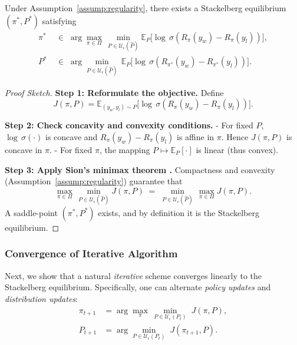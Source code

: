 \begin{theorem}[Existence]
\label{thm:existence_se}
Under Assumption~\ref{assump:regularity}, there exists a Stackelberg equilibrium \((\pi^*,P^*)\) satisfying
\[
\begin{aligned}
\pi^*
&\;\in\; 
\arg\max_{\pi \in \Pi}\,
\min_{P \in \mathcal{U}_\epsilon(\hat{P})} 
\mathbb{E}_P\bigl[\log\,\sigma(R_\pi(y_w)-R_\pi(y_l))\bigr],
\\[3pt]
P^*
&\;\in\; 
\arg\min_{P \in \mathcal{U}_\epsilon(\hat{P})}\,
\mathbb{E}_P\bigl[\log\,\sigma(R_{\pi^*}(y_w)-R_{\pi^*}(y_l))\bigr].
\end{aligned}
\]
\end{theorem}

\begin{proof}[Proof Sketch]
\textbf{Step 1: Reformulate the objective.}  
Define 
\[
J(\pi,P)=\mathbb{E}_{(y_w,y_l)\sim P}\bigl[\log\,\sigma(R_\pi(y_w)-R_\pi(y_l))\bigr].
\]
  
\textbf{Step 2: Check concavity and convexity conditions.}  
- For fixed \(P\), \(\log\,\sigma(\cdot)\) is concave and \(R_\pi(y_w)-R_\pi(y_l)\) is affine in \(\pi\).  Hence \(J(\pi,P)\) is concave in \(\pi\).  
- For fixed \(\pi\), the mapping \(P\mapsto \mathbb{E}_P[\cdot]\) is linear (thus convex).  

\textbf{Step 3: Apply Sion’s minimax theorem \citep{Sion1958Minimax}.}  
Compactness and convexity (Assumption~\ref{assump:regularity}) guarantee that
\[
\max_{\pi\in\Pi}\,\min_{P\in \mathcal{U}_\epsilon(\hat{P})}J(\pi,P)
\;=\;
\min_{P\in \mathcal{U}_\epsilon(\hat{P})}\,\max_{\pi\in\Pi}J(\pi,P).
\]
A saddle-point \((\pi^*,P^*)\) exists, and by definition it is the Stackelberg equilibrium.
\end{proof}

\subsubsection{Convergence of Iterative Algorithm}

Next, we show that a natural \emph{iterative} scheme converges linearly to the Stackelberg equilibrium.  Specifically, one can alternate \emph{policy updates} and \emph{distribution updates}:
\begin{align}
\label{eq:update_policy}
\pi_{t+1} 
&= \arg\max_{\pi}\,
\min_{P \in \mathcal{U}_\epsilon(P_t)}
\;J(\pi,P),
\\[3pt]
\label{eq:update_distribution}
P_{t+1}
&= \arg\min_{P \in \mathcal{U}_\epsilon(P_t)}
\;J(\pi_{t+1},P).
\end{align}

